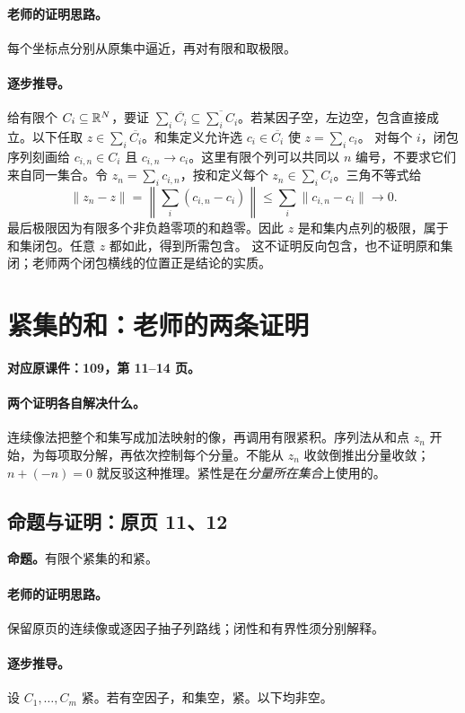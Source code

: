 \paragraph{老师的证明思路。}每个坐标点分别从原集中逼近，再对有限和取极限。

\paragraph{逐步推导。}
给有限个 $C_i\subseteq\mathbb{R}^N$，要证 $\sum_i\overline{C_i}\subseteq\overline{\sum_iC_i}$。若某因子空，左边空，包含直接成立。以下任取 $z\in\sum_i\overline{C_i}$。和集定义允许选 $c_i\in\overline{C_i}$ 使 $z=\sum_i c_i$。
对每个 $i$，闭包序列刻画给 $c_{i,n}\in C_i$ 且 $c_{i,n}\to c_i$。这里有限个列可以共同以 $n$ 编号，不要求它们来自同一集合。令 $z_n=\sum_i c_{i,n}$，按和定义每个 $z_n\in\sum_i C_i$。三角不等式给
\[\|z_n-z\|=\left\|\sum_i(c_{i,n}-c_i)\right\|\le\sum_i\|c_{i,n}-c_i\|\to0.\]
最后极限因为有限多个非负趋零项的和趋零。因此 $z$ 是和集内点列的极限，属于和集闭包。任意 $z$ 都如此，得到所需包含。
这不证明反向包含，也不证明原和集闭；老师两个闭包横线的位置正是结论的实质。


\clearpage\section{紧集的和：老师的两条证明}\label{g:109:11}

\textbf{对应原课件：109，第 11--14 页。}


\paragraph{两个证明各自解决什么。}
连续像法把整个和集写成加法映射的像，再调用有限紧积。序列法从和点 $z_n$ 开始，为每项取分解，再依次控制每个分量。不能从 $z_n$ 收敛倒推出分量收敛；$n+(-n)=0$ 就反驳这种推理。紧性是在\emph{分量所在集合}上使用的。


\subsection{命题与证明：原页 11、12}

\textbf{命题。}有限个紧集的和紧。

\paragraph{老师的证明思路。}保留原页的连续像或逐因子抽子列路线；闭性和有界性须分别解释。

\paragraph{逐步推导。}
设 $C_1,\ldots,C_m$ 紧。若有空因子，和集空，紧。以下均非空。
